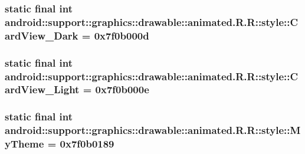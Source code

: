 \hypertarget{classandroid_1_1support_1_1graphics_1_1drawable_1_1animated_1_1_r_1_1style_4b9a35f439f56a27d82c29f833ea9249}{
\subsubsection[{CardView\_\-Dark}]{\setlength{\rightskip}{0pt plus 5cm}static final int android::support::graphics::drawable::animated.R.R::style::CardView\_\-Dark = 0x7f0b000d}}
\label{classandroid_1_1support_1_1graphics_1_1drawable_1_1animated_1_1_r_1_1style_4b9a35f439f56a27d82c29f833ea9249}


\hypertarget{classandroid_1_1support_1_1graphics_1_1drawable_1_1animated_1_1_r_1_1style_7e2acb66d6c8b0bdffaf028c579fc3fe}{
\subsubsection[{CardView\_\-Light}]{\setlength{\rightskip}{0pt plus 5cm}static final int android::support::graphics::drawable::animated.R.R::style::CardView\_\-Light = 0x7f0b000e}}
\label{classandroid_1_1support_1_1graphics_1_1drawable_1_1animated_1_1_r_1_1style_7e2acb66d6c8b0bdffaf028c579fc3fe}


\hypertarget{classandroid_1_1support_1_1graphics_1_1drawable_1_1animated_1_1_r_1_1style_264ddeb1626adc2713eb7fd5bc146dd2}{
\subsubsection[{MyTheme}]{\setlength{\rightskip}{0pt plus 5cm}static final int android::support::graphics::drawable::animated.R.R::style::MyTheme = 0x7f0b0189}}
\label{classandroid_1_1support_1_1graphics_1_1drawable_1_1animated_1_1_r_1_1style_264ddeb1626adc2713eb7fd5bc146dd2}


